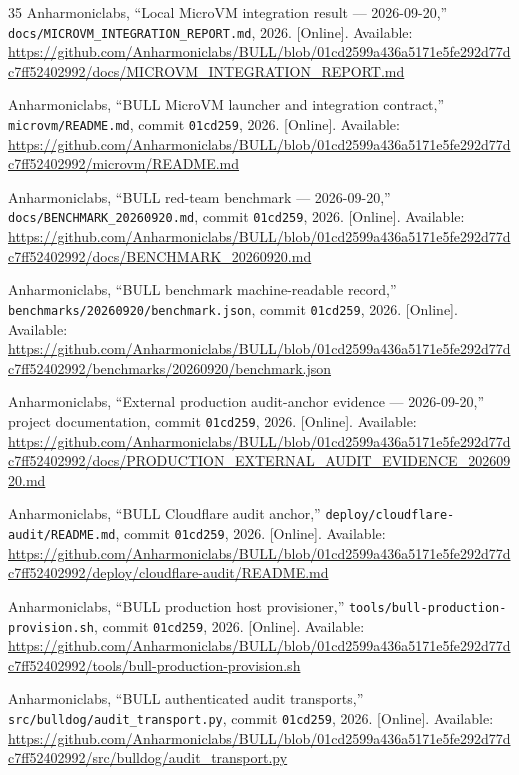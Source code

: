 \documentclass[journal]{IEEEtran}
\begin{document}
\begin{thebibliography}{35}
Anharmoniclabs, ``Local MicroVM integration result --- 2026-09-20,'' \texttt{docs/MICROVM\_INTEGRATION\_REPORT.md}, 2026. [Online]. Available: \url{https://github.com/Anharmoniclabs/BULL/blob/01cd2599a436a5171e5fe292d77dc7ff52402992/docs/MICROVM_INTEGRATION_REPORT.md}

Anharmoniclabs, ``BULL MicroVM launcher and integration contract,'' \texttt{microvm/README.md}, commit \texttt{01cd259}, 2026. [Online]. Available: \url{https://github.com/Anharmoniclabs/BULL/blob/01cd2599a436a5171e5fe292d77dc7ff52402992/microvm/README.md}

Anharmoniclabs, ``BULL red-team benchmark --- 2026-09-20,'' \texttt{docs/BENCHMARK\_20260920.md}, commit \texttt{01cd259}, 2026. [Online]. Available: \url{https://github.com/Anharmoniclabs/BULL/blob/01cd2599a436a5171e5fe292d77dc7ff52402992/docs/BENCHMARK_20260920.md}

Anharmoniclabs, ``BULL benchmark machine-readable record,'' \texttt{benchmarks/20260920/benchmark.json}, commit \texttt{01cd259}, 2026. [Online]. Available: \url{https://github.com/Anharmoniclabs/BULL/blob/01cd2599a436a5171e5fe292d77dc7ff52402992/benchmarks/20260920/benchmark.json}

Anharmoniclabs, ``External production audit-anchor evidence --- 2026-09-20,'' project documentation, commit \texttt{01cd259}, 2026. [Online]. Available: \url{https://github.com/Anharmoniclabs/BULL/blob/01cd2599a436a5171e5fe292d77dc7ff52402992/docs/PRODUCTION_EXTERNAL_AUDIT_EVIDENCE_20260920.md}

Anharmoniclabs, ``BULL Cloudflare audit anchor,'' \texttt{deploy/cloudflare-audit/README.md}, commit \texttt{01cd259}, 2026. [Online]. Available: \url{https://github.com/Anharmoniclabs/BULL/blob/01cd2599a436a5171e5fe292d77dc7ff52402992/deploy/cloudflare-audit/README.md}

Anharmoniclabs, ``BULL production host provisioner,'' \texttt{tools/bull-production-provision.sh}, commit \texttt{01cd259}, 2026. [Online]. Available: \url{https://github.com/Anharmoniclabs/BULL/blob/01cd2599a436a5171e5fe292d77dc7ff52402992/tools/bull-production-provision.sh}

Anharmoniclabs, ``BULL authenticated audit transports,'' \texttt{src/bulldog/audit\_transport.py}, commit \texttt{01cd259}, 2026. [Online]. Available: \url{https://github.com/Anharmoniclabs/BULL/blob/01cd2599a436a5171e5fe292d77dc7ff52402992/src/bulldog/audit_transport.py}


\end{thebibliography}
\end{document}
